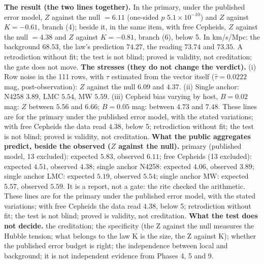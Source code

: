 \textbf{The result (the two lines together).} In the primary, under the published error model, $Z$ against the null $=6.11$ (one-sided $p$ $5.1\times10^{-10}$) and $Z$ against $K=-0.61$, branch (4); beside it, in the same item, with free Cepheids, $Z$ against the null $=4.38$ and $Z$ against $K=-0.81$, branch (6), below 5. In km/s/Mpc: the background $68.53$, the law's prediction $74.27$, the reading $73.74$ and $73.35$. A retrodiction without fit; the test is not blind; proved is validity, not creditation; the gate does not move.
\textbf{The stresses (they do not change the verdict).} (i) Row noise in the 111 rows, with $\tau$ estimated from the vector itself ($\hat\tau=0.0222$ mag, post-observation): $Z$ against the null $6.09$ and $4.37$. (ii) Single anchor: N4258 $3.89$, LMC $5.54$, MW $5.59$. (iii) Cepheid bias varying by host, $B=0.02$ mag: $Z$ between $5.56$ and $6.66$; $B=0.05$ mag: between $4.73$ and $7.48$. These lines are for the primary under the published error model, with the stated variations; with free Cepheids the data read $4.38$, below 5; retrodiction without fit; the test is not blind; proved is validity, not creditation.
\textbf{What the public aggregates predict, beside the observed ($Z$ against the null).} primary (published model, 13 excluded): expected $5.83$, observed $6.11$; free Cepheids (13 excluded): expected $4.51$, observed $4.38$; single anchor N4258: expected $4.06$, observed $3.89$; single anchor LMC: expected $5.19$, observed $5.54$; single anchor MW: expected $5.57$, observed $5.59$. It is a report, not a gate: the rite checked the arithmetic. These lines are for the primary under the published error model, with the stated variations; with free Cepheids the data read $4.38$, below 5; retrodiction without fit; the test is not blind; proved is validity, not creditation.
\textbf{What the test does not decide.} the creditation; the specificity (the Z against the null measures the Hubble tension; what belongs to the law K is the size, the Z against K); whether the published error budget is right; the independence between local and background; it is not independent evidence from Phases 4, 5 and 9.
